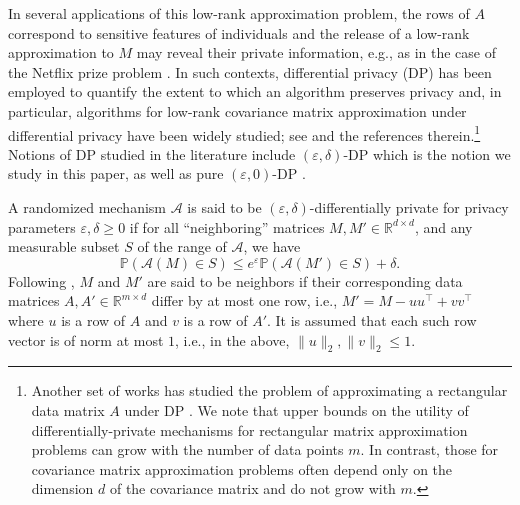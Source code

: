 \documentclass[11pt,letterpaper]{article}
\newcommand{\eps}{\varepsilon}
\begin{document}
In several applications of this low-rank approximation problem, the rows of $A$ correspond to sensitive features of individuals and the release of a low-rank approximation to $M$ may reveal their private information, e.g., as in the case of the Netflix prize problem   \cite{bennett2007netflix}. 
%
In such contexts, differential privacy (DP) has been employed to quantify the extent to which an algorithm preserves privacy   \cite{dwork2006calibrating} and, in particular, algorithms for low-rank covariance matrix approximation under differential privacy have been widely studied; see     \cite{blum2005practical, dwork2006calibrating, blocki2012johnson,  kapralov2013differentially, dwork2014analyze,  upadhyay2018price,  sheffet2019old,mangoubi2022private} and the references therein.\footnote{Another set of works has studied the problem of approximating a rectangular data matrix $A$ under DP  \cite{blum2005practical, achlioptas2007fast, hardt2012beating, hardt2013beyond}.
%
%
 We note that upper bounds on the utility of differentially-private mechanisms for rectangular matrix approximation problems can grow with the number of data points $m$. In contrast, those for covariance matrix approximation problems often depend only on the dimension $d$ of the covariance matrix and do not grow with $m$.}
%
Notions of DP studied in the literature include $(\eps, \delta)$-DP \cite{dwork2006calibrating, hardt2012beating, hardt2013beyond, dwork2014analyze} which is the notion we study in this paper, as well as pure $(\eps, 0)$-DP \cite{dwork2006calibrating, kapralov2013differentially, amin2019differentially, leake2020polynomial, mangoubi2022private}.
%

A randomized mechanism $\mathcal{A}$ is said to be $(\eps, \delta)$-differentially private for  privacy parameters $\eps, \delta \geq 0$  if for all ``neighboring'' matrices $M, M' \in  \mathbb{R}^{d \times d}$, and any measurable subset $S$ of the range of $\mathcal{A}$, we have 
\begin{equation}\label{DP}
 \mathbb{P}(\mathcal{A}(M) \in S) \leq e^\eps \mathbb{P}(\mathcal{A}(M') \in S) + \delta.
\end{equation}
%
Following \cite{blum2005practical, dwork2006calibrating}, $M$ and $M'$ are said to be neighbors if their corresponding data matrices $A,A' \in \mathbb{R}^{m \times d}$ differ by at most one row, i.e., $M'=M-uu^\top+vv^\top$ where $u$ is a row of $A$ and $v$ is a row of $A'$. 
It is assumed that each such row vector is of norm at most $1$, i.e., in the above, $\|u\|_2,\|v\|_2\leq 1$.
%
\end{document}

